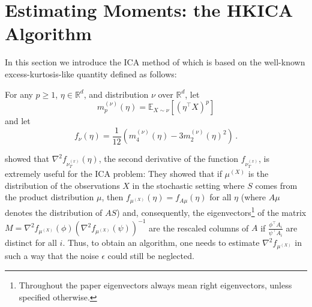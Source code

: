\documentclass{article}
\newcommand{\E}{\mathbb{E}}
\newcommand{\real}{\mathbb{R}}
\newcommand{\R}{\real}
\theoremstyle{definition}
\begin{document}
\section{Estimating Moments: the HKICA Algorithm}

In this section we introduce the ICA method of \citet{hsu2013learning} which is based on the well-known excess-kurtosis-like quantity
defined as follows:

For any $p\ge 1$, $\eta\in \real^d$, and distribution $\nu$ over $\R^d$,
let 
\begin{equation}
\label{eq:momnent}
m_p^{(\nu)}(\eta) = \E_{X\sim \nu}[ (\eta^\top X)^p ]
\end{equation}
and let
\begin{equation}
\label{eq:funcf}
f_{\nu}(\eta) = \frac1{12} \left( m_4^{(\nu)}(\eta) - 3 m_2^{(\nu)}(\eta)^2 \right)\,.
\end{equation}

\citet{hsu2013learning} showed that $\nabla^2f_{\nu_T^{(x)}}(\eta)$, the second derivative of the function $f_{\nu_T^{(x)}}$, is extremely useful for the ICA problem:
They showed that if $\mu^{(X)}$ is the distribution of the observations $X$ in the stochastic setting where $S$ comes from the product distribution $\mu$, then
$f_{\mu^{(X)}}(\eta)=f_{A\mu}(\eta)$ for all $\eta$ (where $A\mu$ denotes the distribution of $AS$) and, consequently, the eigenvectors\footnote{Throughout the paper eigenvectors always mean right eigenvectors, unless specified otherwise.} of the matrix $M=\nabla^2f_{\mu^{(X)}}(\phi)(\nabla^2f_{\mu^{(X)}}(\psi))^{-1}$ are the rescaled columns of $A$ if $\frac{\phi^\top A_i}{\psi^\top A_i}$ are distinct for all $i$. Thus, to obtain an algorithm, one needs to estimate $\nabla^2 f_{\mu^{(X)}}$ in such a way that the noise $\epsilon$ could still be neglected.
\end{document}
